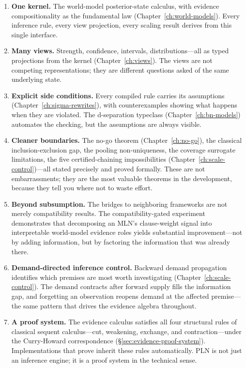 \documentclass[11pt,openany]{report}
\begin{document}
\begin{enumerate}
\item \textbf{One kernel.}  The world-model posterior-state calculus,
  with evidence compositionality as the fundamental law
  (Chapter~\ref{ch:world-models}).  Every inference rule, every view
  projection, every scaling result derives from this single interface.

\item \textbf{Many views.}  Strength, confidence, intervals,
  distributions---all as typed projections from the kernel
  (Chapter~\ref{ch:views}).  The views are not competing
  representations; they are different questions asked of the same
  underlying state.

\item \textbf{Explicit side conditions.}  Every compiled rule carries
  its assumptions (Chapter~\ref{ch:sigma-rewrites}), with
  counterexamples showing what happens when they are violated.  The
  d-separation typeclass (Chapter~\ref{ch:bn-models}) automates the
  checking, but the assumptions are always visible.

\item \textbf{Cleaner boundaries.}  The no-go theorem
  (Chapter~\ref{ch:no-go}), the classical inclusion-exclusion gap,
  the pooling non-uniqueness, the coverage surrogate limitations,
  the five certified-chaining impossibilities
  (Chapter~\ref{ch:scale-control})---all stated precisely and proved
  formally.  These are not embarrassments; they are the most valuable
  theorems in the development, because they tell you where not to
  waste effort.

\item \textbf{Beyond subsumption.}  The bridges to neighboring
  frameworks are not merely compatibility results.  The
  compatibility-gated experiment demonstrates that decomposing an
  MLN's clause-weight signal into interpretable world-model evidence
  roles yields substantial improvement---not by adding information,
  but by factoring the information that was already there.

\item \textbf{Demand-directed inference control.}
  Backward demand propagation identifies which premises are most
  worth investigating (Chapter~\ref{ch:scale-control}).  The
  demand contracts after forward supply fills the information gap,
  and forgetting an observation reopens demand at the affected
  premise---the same  pattern that drives the
  evidence algebra throughout.

\item \textbf{A proof system.}
  The evidence calculus satisfies all four structural rules of
  classical sequent calculus---cut, weakening, exchange, and
  contraction---under the Curry-Howard correspondence
  (\S\ref{sec:evidence-proof-system}).  Implementations that prove
   inherit these rules automatically.
  PLN is not just an inference engine; it is a proof system in the
  technical sense.
\end{enumerate}
\end{document}
